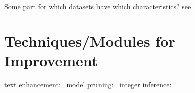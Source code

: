 Some part for which datasets have which characteristics? see~\cite{long_scene_2021}

\section{Techniques/Modules for Improvement}

text enhancement:~\cite{chen_text_2021}
model pruning:~\cite{niu_26ms_2019}
integer inference:~\cite{ignatov_ai_2019}
